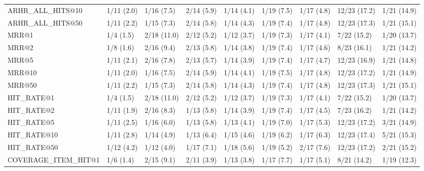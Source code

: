 \begin{tabular}{lllllllll}
ARHR_ALL_HITS@10            &     1/11 (2.0) &     1/16 (7.5) &    2/14 (5.9) &    1/14 (4.1) &  1/19 (7.5) &   1/17 (4.8) &   12/23 (17.2) &        1/21 (14.9) \\
ARHR_ALL_HITS@50            &     1/11 (2.2) &     1/15 (7.3) &    2/14 (5.8) &    1/14 (4.3) &  1/19 (7.4) &   1/17 (4.8) &   12/23 (17.3) &        1/21 (15.1) \\
MRR@1                       &      1/4 (1.5) &    2/18 (11.0) &    2/12 (5.2) &    1/12 (3.7) &  1/19 (7.3) &   1/17 (4.1) &    7/22 (15.2) &        1/20 (13.7) \\
MRR@2                       &      1/8 (1.6) &     2/16 (9.4) &    2/13 (5.8) &    1/14 (3.8) &  1/19 (7.4) &   1/17 (4.6) &    8/23 (16.1) &        1/21 (14.2) \\
MRR@5                       &     1/11 (2.1) &     2/16 (7.8) &    2/13 (5.7) &    1/14 (3.9) &  1/19 (7.4) &   1/17 (4.7) &   12/23 (16.9) &        1/21 (14.8) \\
MRR@10                      &     1/11 (2.0) &     1/16 (7.5) &    2/14 (5.9) &    1/14 (4.1) &  1/19 (7.5) &   1/17 (4.8) &   12/23 (17.2) &        1/21 (14.9) \\
MRR@50                      &     1/11 (2.2) &     1/15 (7.3) &    2/14 (5.8) &    1/14 (4.3) &  1/19 (7.4) &   1/17 (4.8) &   12/23 (17.3) &        1/21 (15.1) \\
HIT_RATE@1                  &      1/4 (1.5) &    2/18 (11.0) &    2/12 (5.2) &    1/12 (3.7) &  1/19 (7.3) &   1/17 (4.1) &    7/22 (15.2) &        1/20 (13.7) \\
HIT_RATE@2                  &     1/11 (1.9) &     2/16 (8.3) &    1/13 (5.8) &    1/14 (3.9) &  1/19 (7.4) &   1/17 (4.5) &    7/23 (16.2) &        1/21 (14.2) \\
HIT_RATE@5                  &     1/11 (2.5) &     1/16 (6.0) &    1/13 (5.8) &    1/13 (4.1) &  1/19 (7.0) &   1/17 (5.3) &   12/23 (17.2) &        3/21 (14.9) \\
HIT_RATE@10                 &     1/11 (2.8) &     1/14 (4.9) &    1/13 (6.4) &    1/15 (4.6) &  1/19 (6.2) &   1/17 (6.3) &   12/23 (17.4) &        5/21 (15.3) \\
HIT_RATE@50                 &     1/12 (4.2) &     1/12 (4.0) &    1/17 (7.1) &    1/18 (5.6) &  1/19 (5.2) &   2/17 (7.6) &   12/23 (17.2) &        2/21 (15.2) \\
COVERAGE_ITEM_HIT@1         &      1/6 (1.4) &     2/15 (9.1) &    2/11 (3.9) &    1/13 (3.8) &  1/17 (7.7) &   1/17 (5.1) &    8/21 (14.2) &        1/19 (12.3) \\

\end{tabular}
